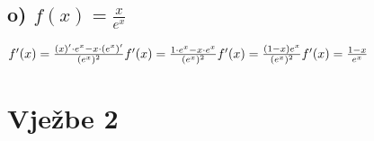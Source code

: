 \documentclass{article}
\begin{document}
\subsection{o) $f(x) = \frac{x}{e^x}$}
$
  f'(x) = \frac{(x)' \cdot e^x - x \cdot (e^x)'}{(e^x)^2}
  \\
  \\
  f'(x) = \frac{1 \cdot e^x - x \cdot e^x}{(e^x)^2}
  \\
  \\
  f'(x) = \frac{(1-x) e^x}{(e^x)^2}
  \\
  \\
  f'(x) = \frac{1-x}{e^x}
$

\section{Vježbe 2}
\end{document}
